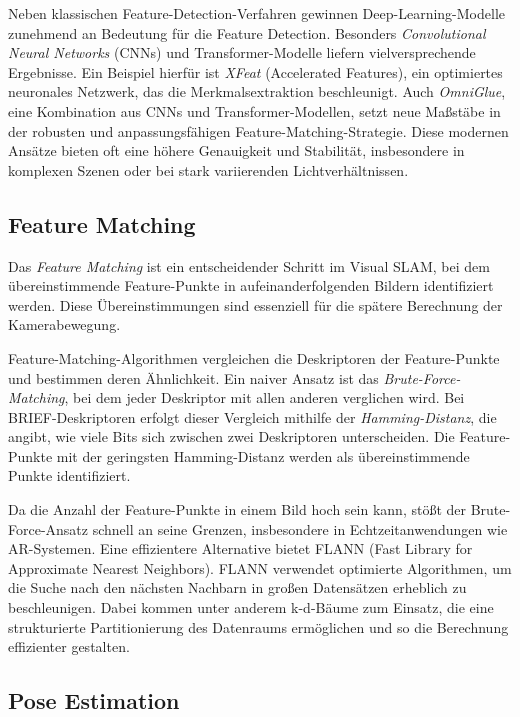 Neben klassischen Feature-Detection-Verfahren gewinnen Deep-Learning-Modelle zunehmend an Bedeutung für die Feature Detection. Besonders \emph{Convolutional Neural Networks} (CNNs) und Transformer-Modelle liefern vielversprechende Ergebnisse. Ein Beispiel hierfür ist \emph{XFeat} (Accelerated Features), ein optimiertes neuronales Netzwerk, das die Merkmalsextraktion beschleunigt. Auch \emph{OmniGlue}, eine Kombination aus CNNs und Transformer-Modellen, setzt neue Maßstäbe in der robusten und anpassungsfähigen Feature-Matching-Strategie. Diese modernen Ansätze bieten oft eine höhere Genauigkeit und Stabilität, insbesondere in komplexen Szenen oder bei stark variierenden Lichtverhältnissen. \cite{ghosh2024fmNN}

\subsection{Feature Matching}

Das \emph{Feature Matching} ist ein entscheidender Schritt im Visual SLAM, bei dem übereinstimmende Feature-Punkte in aufeinanderfolgenden Bildern identifiziert werden. Diese Übereinstimmungen sind essenziell für die spätere Berechnung der Kamerabewegung. \cite{gao2021vSLAM, szeliski2022computerVision}

Feature-Matching-Algorithmen vergleichen die Deskriptoren der Feature-Punkte und bestimmen deren Ähnlichkeit. Ein naiver Ansatz ist das \emph{Brute-Force-Matching}, bei dem jeder Deskriptor mit allen anderen verglichen wird. Bei BRIEF-Deskriptoren erfolgt dieser Vergleich mithilfe der \emph{Hamming-Distanz}, die angibt, wie viele Bits sich zwischen zwei Deskriptoren unterscheiden. Die Feature-Punkte mit der geringsten Hamming-Distanz werden als übereinstimmende Punkte identifiziert. \cite{gao2021vSLAM, szeliski2022computerVision}

Da die Anzahl der Feature-Punkte in einem Bild hoch sein kann, stößt der Brute-Force-Ansatz schnell an seine Grenzen, insbesondere in Echtzeitanwendungen wie AR-Systemen. Eine effizientere Alternative bietet FLANN (Fast Library for Approximate Nearest Neighbors). FLANN verwendet optimierte Algorithmen, um die Suche nach den nächsten Nachbarn in großen Datensätzen erheblich zu beschleunigen. Dabei kommen unter anderem k-d-Bäume zum Einsatz, die eine strukturierte Partitionierung des Datenraums ermöglichen und so die Berechnung effizienter gestalten. \cite{gao2021vSLAM, muja2009flann}

\subsection{Pose Estimation}

